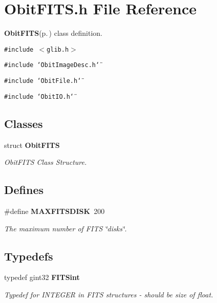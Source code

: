 \section{Obit\-FITS.h File Reference}
\label{ObitFITS_8h}
{\bf Obit\-FITS}{\rm (p.\,\pageref{structObitFITS})} class definition. 

{\tt \#include $<$glib.h$>$}\par
{\tt \#include \char`\"{}Obit\-Image\-Desc.h\char`\"{}}\par
{\tt \#include \char`\"{}Obit\-File.h\char`\"{}}\par
{\tt \#include \char`\"{}Obit\-IO.h\char`\"{}}\par
\subsection*{Classes}
\begin{CompactItemize}
\item 
struct {\bf Obit\-FITS}
\begin{CompactList}\small\item\em Obit\-FITS Class Structure. \item\end{CompactList}\end{CompactItemize}
\subsection*{Defines}
\begin{CompactItemize}
\item 
\#define {\bf MAXFITSDISK}\ 200
\begin{CompactList}\small\item\em The maximum number of FITS \char`\"{}disks\char`\"{}. \item\end{CompactList}\end{CompactItemize}
\subsection*{Typedefs}
\begin{CompactItemize}
\item 
typedef gint32 {\bf FITSint}
\begin{CompactList}\small\item\em Typedef for INTEGER in FITS structures - should be size of float. \item\end{CompactList}\end{CompactItemize}
